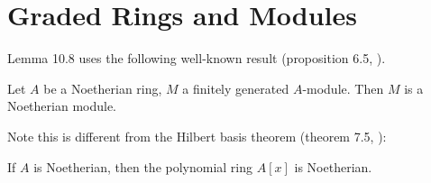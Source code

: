 \documentclass{note}
\begin{document}
\section*{Graded Rings and Modules}
Lemma 10.8 uses the following well-known result (proposition 6.5, ).
\begin{proposition*}
  Let $A$ be a Noetherian ring, $M$ a finitely generated $A$-module. Then $M$ is
  a Noetherian module.
\end{proposition*}
Note this is different from the Hilbert basis theorem (theorem 7.5, ):
\begin{theorem*}
  If $A$ is Noetherian, then the polynomial ring $A[x]$ is Noetherian.
\end{theorem*}
\end{document}
